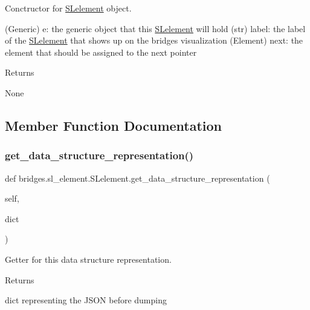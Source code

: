 Conctructor for \hyperlink{classbridges_1_1sl__element_1_1_s_lelement}{S\+Lelement} object. 

(Generic) e\+: the generic object that this \hyperlink{classbridges_1_1sl__element_1_1_s_lelement}{S\+Lelement} will hold (str) label\+: the label of the \hyperlink{classbridges_1_1sl__element_1_1_s_lelement}{S\+Lelement} that shows up on the bridges visualization (Element) next\+: the element that should be assigned to the next pointer \begin{DoxyReturn}{Returns}


None 
\end{DoxyReturn}


\subsection{Member Function Documentation}
\mbox{\label{classbridges_1_1sl__element_1_1_s_lelement_af1d3039c3597ce0345d1cd973711714f}} 
\subsubsection{\texorpdfstring{get\+\_\+data\+\_\+structure\+\_\+representation()}{get\_data\_structure\_representation()}}
{\footnotesize\ttfamily def bridges.\+sl\+\_\+element.\+S\+Lelement.\+get\+\_\+data\+\_\+structure\+\_\+representation (\begin{DoxyParamCaption}\item[{}]{self,  }\item[{}]{dict }\end{DoxyParamCaption})}



Getter for this data structure representation. 

\begin{DoxyReturn}{Returns}


dict representing the J\+S\+ON before dumping 
\end{DoxyReturn}
\mbox{\label{classbridges_1_1sl__element_1_1_s_lelement_aa39835634a95d832d092dd3c057a49cf}} 
